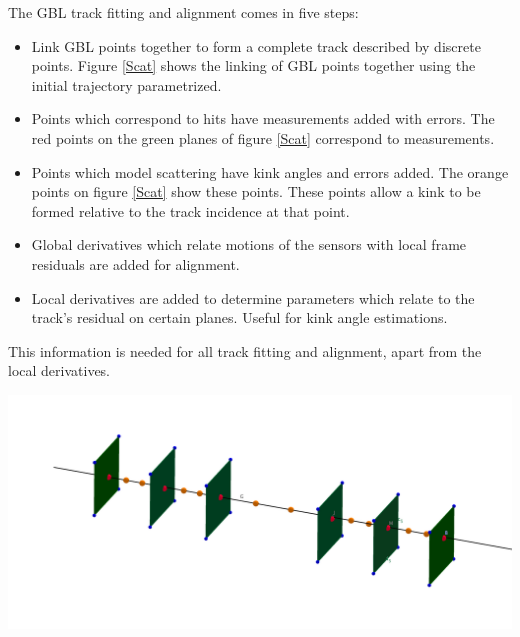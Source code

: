 \documentclass[a0,portrait]{a0poster}
\begin{document}
\begin{multicols}{2}
\begin{tcolorbox}
The GBL track fitting and alignment comes in five steps:
\begin{itemize}
\item Link GBL points together to form a complete track described by discrete points. Figure \ref{Scat} shows the linking of GBL points together using the initial trajectory parametrized.
\item Points which correspond to hits have measurements added with errors. The red points on the green planes of figure \ref{Scat} correspond to measurements.
\item Points which model scattering have kink angles and errors added. The orange points on figure \ref{Scat} show these points. These points allow a kink to be formed relative to the track incidence at that point.
\item Global derivatives which relate motions of the sensors with local frame residuals are added for alignment.
\item Local derivatives are added to determine parameters which relate to the track's residual on certain planes. Useful for kink angle estimations.
\end{itemize}

This information is needed for all track fitting and alignment, apart from the local derivatives.

\end{tcolorbox}
\begin{center}
\includegraphics[width=1.0\linewidth]{figures/meas-scat-jac-link.png}
\label{Scat}
\end{center}

\end{multicols}
\end{document}
